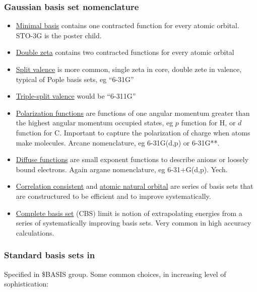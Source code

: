 \documentclass[11pt]{article}
\begin{document}
\subsubsection{Gaussian basis set nomenclature}
\label{sec:orgbefab83}
\begin{itemize}
\item \uline{Minimal basis} contains one contracted function for every atomic orbital. STO-3G is the
poster child.
\item \uline{Double zeta} contains two contracted functions for every atomic orbital
\item \uline{Split valence} is more common, single zeta in core, double zete in valence, typical of Pople basis sets, eg ``6-31G''
\item \uline{Triple-split valence} would be ``6-311G''
\item \uline{Polarization functions} are functions of one angular momentum greater than the highest angular momentum occupied states, eg \(p\) function for H, or \(d\) function for C. Important to capture the polarization of charge when atoms make molecules.  Arcane nomenclature, eg 6-31G(d,p) or 6-31G**.
\item \uline{Diffuse functions} are small exponent functions to describe anions or loosely bound electrons. Again argane nomenclature, eg 6-31+G(d,p). Yech.
\item \uline{Correlation consistent} and \uline{atomic natural orbital} are series of basis sets that are constructured to be efficient and to improve systematically.
\item \uline{Complete basis set} (CBS) limit is notion of extrapolating energies from a series of systematically improving basis sets.  Very common in high accuracy calculations.
\end{itemize}

\subsubsection{Standard basis sets in}
\label{sec:org098d25a}
Specified in \$BASIS group.  Some common choices, in increasing level of sophistication:
\end{document}
